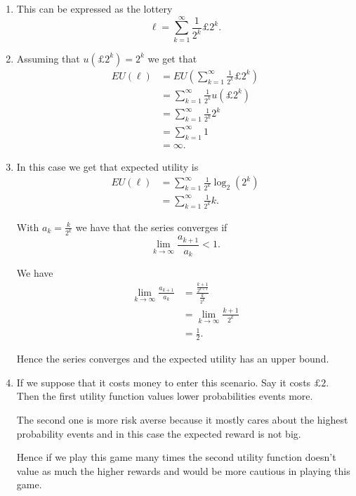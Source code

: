\documentclass[a4paper]{article}
\begin{document}
  \begin{exercise}{8}
    \begin{enumerate}[label=(\alph*)]
      \item This can be expressed as the lottery
        \begin{equation*}
          \ell = \sum_{k = 1}^{\infty} \frac{1}{2^{k}}\pounds 2^{k}
        .\end{equation*}

      \item Assuming that $ u(\pounds 2^{k}) = 2^{k} $ we get that
        \begin{align*}
          EU(\ell) &= EU \left( \sum_{k=1}^{\infty} \frac{1}{2^{k}} \pounds 2^{k} \right) \\
                   &= \sum_{k=1}^{\infty} \frac{1}{2^{k}}u(\pounds 2^{k}) \\
                   &= \sum_{k=1}^{\infty} \frac{1}{2^{k}}2^{k} \\
                   &= \sum_{k=1}^{\infty} 1 \\
                   &= \infty
        .\end{align*}

      \item In this case we get that expected utility is
        \begin{align*}
          EU(\ell) &= \sum_{k=1}^{\infty} \frac{1}{2^{k}}\log_2(2^{k}) \\
                   &= \sum_{k=1}^{\infty} \frac{1}{2^{k}}k
        .\end{align*}

        With $ a_k = \frac{k}{2^{k}} $ we have that the series converges if
        \begin{equation*}
        \lim_{k \to \infty} \frac{a_{k+1}}{a_k} < 1
        .\end{equation*}

        We have
        \begin{align*}
          \lim_{k\to \infty} \frac{a_{k+1}}{a_k} &= \frac{\frac{k+1}{2^{k+1}}}{\frac{k}{2^{k}}} \\
                                                 &= \lim_{k\to \infty} \frac{k+1}{2^{k}} \\
                                                 &= \frac{1}{2}
        .\end{align*}

        Hence the series converges and the expected utility has an upper bound.

      \item If we suppose that it costs money to enter this scenario. Say it costs $ \pounds 2 $. Then the first utility function values lower probabilities events more.

        The second one is more risk averse because it mostly cares about the highest probability events and in this case the expected reward is not big.

        Hence if we play this game many times the second utility function doesn't value as much the higher rewards and would be more cautious in playing this game.
    \end{enumerate}
  \end{exercise}
\end{document}
